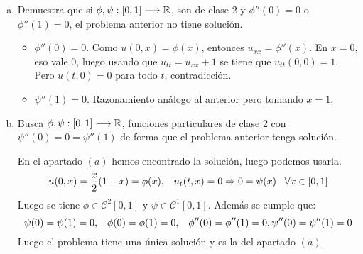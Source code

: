 \documentclass[12pt]{article}
\theoremstyle{definition}
\theoremstyle{remark}
\begin{document}
\begin{enumerate}[(a)]
\item Demuestra que si $\phi,\psi : [0,1] \longrightarrow \mathbb{R}$, son de clase 2 y $\phi''(0)=0$ o $\phi''(1)=0$, el problema anterior no tiene solución.

\begin{itemize}
\item $\phi''(0)=0$. Como $u(0,x)=\phi(x)$, entonces $u_{xx}=\phi''(x)$. En $x=0$, eso vale 0, luego usando que $u_{tt}=u_{xx}+1$ se tiene que $u_{tt}(0,0)=1$. Pero $u(t,0)=0$ para todo $t$, contradicción.
\item $\psi''(1)=0$. Razonamiento análogo al anterior pero tomando $x=1$.
\end{itemize}
\item Busca $\phi,\psi : [0,1] \longrightarrow \mathbb{R}$, funciones particulares de clase 2 con $\psi''(0)=0=\psi''(1)$ de forma que el problema anterior tenga solución.

En el apartado $(a)$ hemos encontrado la solución, luego podemos usarla.
\[
u(0,x)=\frac{x}{2}(1-x)=\phi(x), \;\;\; u_t(t,x)=0 \Rightarrow 0=\psi(x) \;\;\; \forall x\in[0,1]
\]
Luego se tiene $\phi\in\mathcal{C}^2[0,1]$ y $\psi\in\mathcal{C}^1[0,1]$. Además se cumple que:
\[
\psi(0)=\psi(1)=0, \;\;\; \phi(0)=\phi(1)=0, \;\;\; \phi''(0)=\phi''(1)=0, \psi''(0)=\psi''(1)=0
\]
Luego el problema tiene una única solución y es la del apartado $(a)$.
\end{enumerate}
\end{document}
